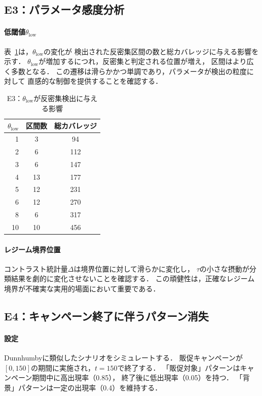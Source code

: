 \subsection{E3：パラメータ感度分析}

\paragraph{低閾値$\theta_{\text{low}}$}
表~\ref{tab:e3}は，$\theta_{\text{low}}$の変化が
検出された反密集区間の数と総カバレッジに与える影響を示す．
$\theta_{\text{low}}$が増加するにつれ，反密集と判定される位置が増え，
区間はより広く多数となる．
この遷移は滑らかかつ単調であり，パラメータが検出の粒度に対して
直感的な制御を提供することを確認する．

\begin{table}[t]
\centering
\caption{E3：$\theta_{\text{low}}$が反密集検出に与える影響}
\label{tab:e3}
\begin{tabular}{rcc}
\toprule
$\theta_{\text{low}}$ & 区間数 & 総カバレッジ \\
\midrule
1  &  3 &  94 \\
2  &  6 & 112 \\
3  &  6 & 147 \\
4  & 13 & 177 \\
5  & 12 & 231 \\
6  & 12 & 270 \\
8  &  6 & 317 \\
10 & 10 & 456 \\
\bottomrule
\end{tabular}
\end{table}

\paragraph{レジーム境界位置}
コントラスト統計量$\Delta$は境界位置に対して滑らかに変化し，
$\tau$の小さな摂動が分類結果を劇的に変化させないことを確認する．
この頑健性は，正確なレジーム境界が不確実な実用的場面において重要である．

\subsection{E4：キャンペーン終了に伴うパターン消失}

\paragraph{設定}
Dunnhumbyに類似したシナリオをシミュレートする．
販促キャンペーンが$[0, 150]$の期間に実施され，$t = 150$で終了する．
「販促対象」パターンはキャンペーン期間中に高出現率（0.85），
終了後に低出現率（0.05）を持つ．
「背景」パターンは一定の出現率（0.4）を維持する．

